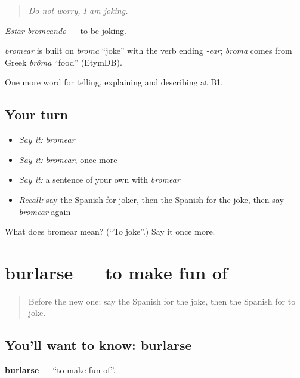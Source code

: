 \begin{quote}
\emph{Do not worry, I am joking.}
\end{quote}

\emph{Estar bromeando} — to be joking.

\begin{cousinweb}
\emph{bromear} is built on \emph{broma} \textquotedblleft{}joke\textquotedblright{} with the verb ending \emph{-ear}; \emph{broma} comes from Greek \emph{brôma} \textquotedblleft{}food\textquotedblright{} (EtymDB).
\end{cousinweb}

\begin{grammarlens}[title={What you've built}]
One more word for telling, explaining and describing at B1.
\end{grammarlens}

\subsection*{Your turn}
\begin{itemize}
\raggedright
  \item \emph{Say it:} \emph{bromear}
  \item \emph{Say it:} \emph{bromear}, once more
  \item \emph{Say it:} a sentence of your own with \emph{bromear}
  \item \emph{Recall:} say the Spanish for joker, then the Spanish for the joke, then say \emph{bromear} again
\end{itemize}

\begin{tcolorbox}[breakable,colback=teal!4,colframe=teal!35!black,title={Before you move on}]
What does bromear mean? (\textquotedblleft{}To joke\textquotedblright{}.) Say it once more.
\end{tcolorbox}
\section[burlarse]{burlarse — to make fun of}

\label{lesson:ES-C718-burlarse}



\begin{quote}
Before the new one: say the Spanish for the joke, then the Spanish for to joke.
\end{quote}

\subsection*{You'll want to know: burlarse}
\textbf{burlarse} — \textquotedblleft{}to make fun of\textquotedblright{}.

